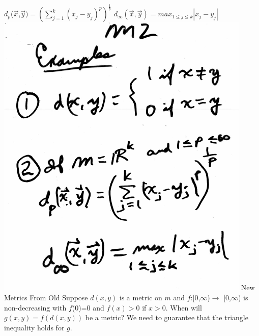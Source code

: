 \documentclass[10pt,a4paper]{article}
\begin{document}
{{\newline
$d_p$($\vec{x}$,$\vec{y}) = (\sum_{j=1}^{k} (x_j-y_j)^p)^\frac{1}{p}$
\newline
$d_\infty(\vec{x},\vec{y}) = max_{1\leq j \leq k} |x_j-y_j|$
\newline
\includegraphics[scale=.5]{Pages/MS_2_im2}
\newpage
New Metrics From Old
\newline
Suppose $d(x,y)$ is a metric 
\newline
on $m$ and $f$:[0,$\infty$)$\rightarrow$ [0,$\infty$) is non-decreasing with 
\newline
$f$(0)=0 and $f(x)>$0 if $x>$0.
\newline
When will
\newline
$g(x,y)=f(d(x,y))$ be a metric?
\newline
We need to guarantee that the triangle inequality holds for $g$.
\newline
}}
\end{document}
